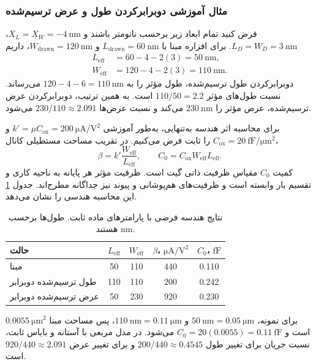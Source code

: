 \subsubsection*{مثال آموزشی دوبرابرکردن طول و عرض ترسیم‌شده}
فرض کنید تمام ابعاد زیر برحسب نانومتر باشند و
\(X_L=X_W=-\qty{4}{\nano\metre}\)،
\(L_D=W_D=\qty{3}{\nano\metre}\).
برای افزاره مبنا با
\(L_{\mathrm{drawn}}=\qty{60}{\nano\metre}\) و
\(W_{\mathrm{drawn}}=\qty{120}{\nano\metre}\)، داریم
\[
 \begin{aligned}
 L_{\mathrm{eff}}&=60-4-2(3)=\qty{50}{\nano\metre},\\
 W_{\mathrm{eff}}&=120-4-2(3)=\qty{110}{\nano\metre}.
 \end{aligned}
\]
دوبرابرکردن طول ترسیم‌شده، طول مؤثر را به
\(120-4-6=\qty{110}{\nano\metre}\) می‌رساند. نسبت طول‌های مؤثر
\(110/50=2.2\) است. به همین ترتیب، دوبرابرکردن عرض ترسیم‌شده،
عرض مؤثر را \(\qty{230}{\nano\metre}\) می‌کند و نسبت عرض‌ها
\(230/110\approx2.091\) می‌شود.

برای محاسبه اثر هندسه به‌تنهایی، به‌طور آموزشی
\(k'=\mu C_{\mathrm{ox}}=\qty{200}{\micro\ampere\per\volt\squared}\)
و \(C_{\mathrm{ox}}=\qty{20}{\femto\farad\per\micro\metre\squared}\)
را ثابت فرض می‌کنیم. در تقریب مساحت مستطیلی کانال،
\begin{equation}
 \beta=k'\frac{W_{\mathrm{eff}}}{L_{\mathrm{eff}}},\qquad
 C_0=C_{\mathrm{ox}}W_{\mathrm{eff}}L_{\mathrm{eff}}.
 \label{eq:geometry-beta-capacitance}
\end{equation}
کمیت \(C_0\) مقیاس ظرفیت ذاتی گیت است. ظرفیت مؤثر هر پایانه به
ناحیه کاری و تقسیم بار وابسته است و ظرفیت‌های هم‌پوشانی و پیوند
نیز جداگانه مطرح‌اند. جدول \ref{tab:geometry-results} این محاسبه
هندسی را نشان می‌دهد.
\begin{table}[!htbp]
\centering
\small
\caption{نتایج هندسه فرضی با پارامترهای ماده ثابت.
طول‌ها برحسب \(\unit{\nano\metre}\) هستند.}
\label{tab:geometry-results}
\begin{tabularx}{\linewidth}{>{\raggedleft\arraybackslash}Xcccc}
\toprule
حالت & \(L_{\mathrm{eff}}\) & \(W_{\mathrm{eff}}\) &
\(\beta\)، \(\unit{\micro\ampere\per\volt\squared}\) &
\(C_0\)، \(\unit{\femto\farad}\)\\
\midrule
مبنا & \num{50} & \num{110} & \num{440} & \num{0.110}\\
طول ترسیم‌شده دوبرابر & \num{110} & \num{110} & \num{200} & \num{0.242}\\
عرض ترسیم‌شده دوبرابر & \num{50} & \num{230} & \num{920} & \num{0.230}\\
\bottomrule
\end{tabularx}
\end{table}
برای نمونه، \(\qty{50}{\nano\metre}=\qty{0.05}{\micro\metre}\)
و \(\qty{110}{\nano\metre}=\qty{0.11}{\micro\metre}\)، پس
مساحت مبنا \(\qty{0.0055}{\micro\metre\squared}\) است و
\(C_0=20(0.0055)=\qty{0.11}{\femto\farad}\) می‌شود.
در مدل مربعی با آستانه و بایاس ثابت، نسبت جریان برای تغییر طول
\(200/440\approx0.4545\) و برای تغییر عرض
\(920/440\approx2.091\) است.

